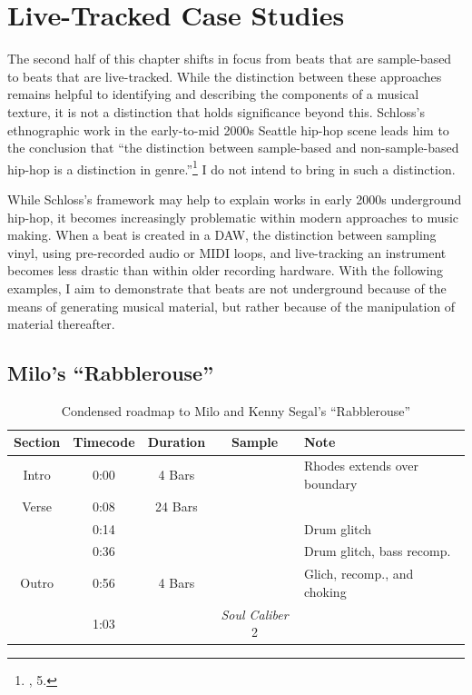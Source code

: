 \section{Live-Tracked Case Studies}
The second half of this chapter shifts in focus from beats that are sample-based to beats that are live-tracked. While the distinction between these approaches remains helpful to identifying and describing the components of a musical texture, it is not a distinction that holds significance beyond this. Schloss's ethnographic work in the early-to-mid 2000s Seattle hip-hop scene leads him to the conclusion that ``the distinction between sample-based and non-sample-based hip-hop is a distinction in genre.''\footnote{\cite{josephgschlossMakingBeatsArt2004}, 5.} I do not intend to bring in such a distinction.

While Schloss's framework may help to explain works in early 2000s underground hip-hop, it becomes increasingly problematic within modern approaches to music making. When a beat is created in a DAW, the distinction between sampling vinyl, using pre-recorded audio or MIDI loops, and live-tracking an instrument becomes less drastic than within older recording hardware. With the following examples, I aim to demonstrate that beats are not underground because of the means of generating musical material, but rather because of the manipulation of material thereafter.

\subsection*{\centering Milo's ``Rabblerouse''}

\begin{table}[ht]
    \centering
        \begin{tabular}{|c|c|c|c|l|}
             \hline
            Section & Timecode & Duration & Sample                  & Note \\ \hline
            Intro   & 0:00     & 4 Bars   &                         & Rhodes extends over boundary \\ \hline
            Verse   & 0:08     & 24 Bars  &                         & \\ \hline
                    & 0:14     &          &                         & Drum glitch \\ \hline
                    & 0:36     &          &                         & Drum glitch, bass recomp. \\ \hline
            Outro   & 0:56     & 4 Bars   &                         & Glich, recomp., and choking \\ \hline
                    & 1:03     &          & \textit{Soul Caliber} 2 & \\ \hline
        \end{tabular}
    \caption{Condensed roadmap to Milo and Kenny Segal's ``Rabblerouse''}
    \label{tab:rabblerouse}
\end{table}

